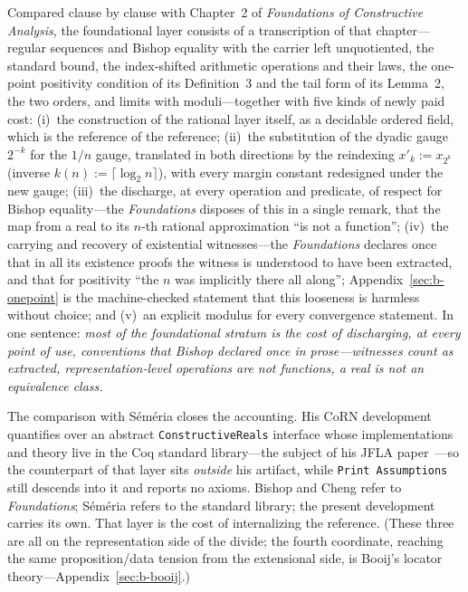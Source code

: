 \documentclass[11pt]{article}
\theoremstyle{definition}
\theoremstyle{remark}
\begin{document}
Compared clause by clause with Chapter~2 of \emph{Foundations of Constructive Analysis}, the foundational layer consists of a transcription of that chapter---regular sequences and Bishop equality with the carrier left unquotiented, the standard bound, the index-shifted arithmetic operations and their laws, the one-point positivity condition of its Definition~3 and the tail form of its Lemma~2, the two orders, and limits with moduli---together with five kinds of newly paid cost: (i)~the construction of the rational layer itself, as a decidable ordered field, which is the reference of the reference; (ii)~the substitution of the dyadic gauge $2^{-k}$ for the $1/n$ gauge, translated in both directions by the reindexing $x'_k:=x_{2^k}$ (inverse $k(n):=\lceil\log_2 n\rceil$), with every margin constant redesigned under the new gauge; (iii)~the discharge, at every operation and predicate, of respect for Bishop equality---the \emph{Foundations} disposes of this in a single remark, that the map from a real to its $n$-th rational approximation ``is not a function''; (iv)~the carrying and recovery of existential witnesses---the \emph{Foundations} declares once that in all its existence proofs the witness is understood to have been extracted, and that for positivity ``the $n$ was implicitly there all along''; Appendix~\ref{sec:b-onepoint} is the machine-checked statement that this looseness is harmless without choice; and (v)~an explicit modulus for every convergence statement.  In one sentence: \emph{most of the foundational stratum is the cost of discharging, at every point of use, conventions that Bishop declared once in prose---witnesses count as extracted, representation-level operations are not functions, a real is not an equivalence class.}

The comparison with S\'em\'eria closes the accounting.  His CoRN development quantifies over an abstract \texttt{ConstructiveReals} interface whose implementations and theory live in the Coq standard library---the subject of his JFLA paper~\cite{semeria-2020-reals}---so the counterpart of that layer sits \emph{outside} his artifact, while \texttt{Print Assumptions} still descends into it and reports no axioms.  Bishop and Cheng refer to \emph{Foundations}; S\'em\'eria refers to the standard library; the present development carries its own.  That layer is the cost of internalizing the reference.  (These three are all on the representation side of the divide; the fourth coordinate, reaching the same proposition/data tension from the extensional side, is Booij's locator theory---Appendix~\ref{sec:b-booij}.)
\end{document}
